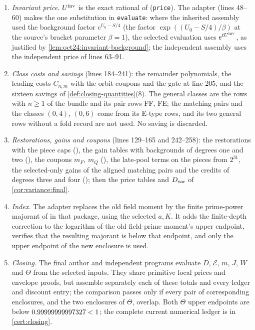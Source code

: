\begin{enumerate}[label=(V\arabic*),leftmargin=*]
 matching gate at line 112.
\item \emph{Invariant price.} $U^{\mathrm{inv}}$ is the exact rational of
 (\texttt{price}). The adapter
  (lines 48--60)
 makes the one substitution in \texttt{evaluate}: where the
 inherited assembly used the background factor $e^{U_0-S/4}$ (the
 factor $\exp((U_0-S/4)/\beta)$ at the source's bracket parameter
 $\beta=1$), the selected evaluation uses $e^{tU^{\mathrm{inv}}}$, as
 justified by \cref{lem:oct24:invariant-background}; the
 independent assembly uses the independent
 price of lines 63--91.
\item \emph{Class costs and savings} (lines 184--241): the remainder
 polynomials, the leading costs $C_{n,m}$ with the orbit coupons and the gate
 at line 205, and the sixteen savings of \cref{def:closing-quantities}(8). The
 general classes are the rows with $n\ge1$ of the bundle and its pair rows FF,
 FE; the matching pairs and the classes $(0,4)$, $(0,6)$ come from its E-type
 rows, and its two general rows without a fold record are not used. No saving
 is discarded.
\item \emph{Restorations, gains and coupons} (lines 129--165 and 242--258): the
 restorations with the piece caps
 (), the
 gain tables with backgrounds of degrees one and two
 (),
 the coupons $m_F$, $m_Q$
 (), the
 late-pool terms on the pieces from $2^{31}$, the selected-only gains of the
 aligned matching pairs and the credits of degrees three and four
 (); then
 the price tables and $D_{\rm var}$ of \cref{cor:variance:final}.
\item \emph{Index.} The adapter
  replaces the old
 field moment by the finite prime-power majorant of
  in that package, using the selected $a,K$.
 It adds the finite-depth correction to the logarithm of the old
 field-prime moment's upper endpoint, verifies that the resulting
 majorant is below that endpoint, and only the upper endpoint of
 the new enclosure is used.
\item \emph{Closing.} The final author and independent programs evaluate
 $D$, $\mathcal E$, $m$, $J$, $W$ and $\Theta$ from the selected inputs. They
 share primitive local prices and envelope proofs, but assemble
 separately each of these totals and every ledger and discount
 entry; the comparison passes only if every pair of corresponding
 enclosures, and the two enclosures of $\Theta$, overlap. Both $\Theta$ upper endpoints are below
 $0.99999999997327<1$; the complete current numerical ledger is in
 \cref{cert:closing}.
\end{enumerate}

